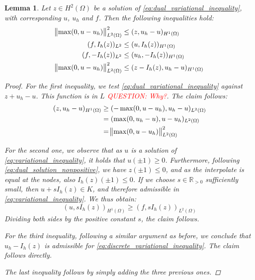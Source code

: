 \documentclass[headsepline,footsepline,footinclude=false,oneside,fontsize=11pt,paper=a4,listof=totoc,bibliography=totoc]{scrbook} %
\newtheorem{lemma}{Lemma}
\begin{document}
\begin{lemma}
	Let $z \in H^2(\Omega)$ be a solution of \eqref{eq:dual_variational_inequality}, with corresponding $u$, $u_h$ and $f$. Then the following inequalities hold:
	\begin{align}
		\norm{\max(0,u-u_h)}_{L^2(\Omega)}^2 &\leq (z,u_h-u)_{H^1(\Omega)} \\
		(f, I_h(z))_{L^2} &\leq (u, I_h(z))_{H^1(\Omega)} \\
		(f, -I_h(z))_{L^2} &\leq (u_h, -I_h(z))_{H^1(\Omega)} \\
		\norm{\max(0,u-u_h)}_{L^2(\Omega)}^2 &\leq (z-I_h(z), u_h - u)_{H^1(\Omega)} \label{eq:scalar_product_ineq_L2}
	\end{align}
	\begin{proof}
		For the first inequality, we test \eqref{eq:dual_variational_inequality} against $z+u_h-u$. This function is in $L$ \textcolor{red}{QUESTION: Why?}. The claim follows:
		\begin{align*}
		(z, u_h-u)_{H^1(\Omega)} &\geq (-\max(0,u-u_h), u_h-u)_{L^2(\Omega)} \\
		&= (\max(0,u_h-u), u-u_h)_{L^2(\Omega)} \\
		&= \norm{\max(0,u-u_h)}_{L^2(\Omega)}^2
		\end{align*}
		
		For the second one, we observe that as $u$ is a solution of \eqref{eq:variational_inequality}, it holds that $u(\pm 1) \geq 0$. Furthermore, following \eqref{eq:dual_solution_nonpositive}, we have $z(\pm 1) \leq 0$, and as the interpolate is equal at the nodes, also $I_h(z)(\pm 1) \leq 0$. If we choose $s \in \mathbb{R}_{>0}$ sufficiently small, then $u + s I_h(z) \in K$, and therefore admissible in \eqref{eq:variational_inequality}. We thus obtain:
		\begin{equation*}
		(u, sI_h(z))_{H^1(\Omega)} \geq (f,sI_h(z))_{L^2(\Omega)}
		\end{equation*}
		Dividing both sides by the positive constant $s$, the claim follows.
		
		For the third inequality, following a similar argument as before, we conclude that $u_h -I_h(z)$ is admissible for \eqref{eq:discrete_variational_inequality}. The claim follows directly.
		
		The last inequality follows by simply adding the three previous ones.
	\end{proof}
\end{lemma}
\end{document}
